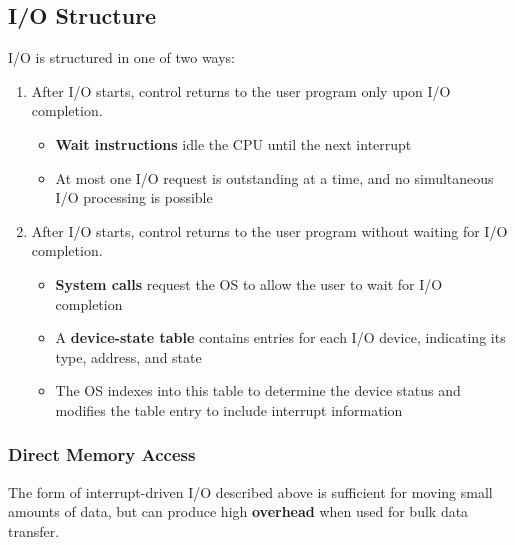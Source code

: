 \documentclass{article}
\begin{document}
\subsection{I/O	Structure}
I/O is structured in one of two ways:
\begin{enumerate}
    \item After I/O starts, control returns to the user program only
          upon I/O completion.
          \begin{itemize}
              \item \textbf{Wait instructions} idle the CPU until the
                    next interrupt
              \item At most one I/O request is outstanding at a time,
                    and no simultaneous I/O processing is possible
          \end{itemize}
    \item After I/O starts, control returns to the user program without
          waiting for I/O completion.
          \begin{itemize}
              \item \textbf{System calls} request the OS to allow the
                    user to wait for I/O completion
              \item A \textbf{device-state table} contains entries for
                    each I/O device, indicating its type, address, and
                    state
              \item The OS indexes into this table to determine the
                    device status and modifies the table entry to
                    include interrupt information
          \end{itemize}
\end{enumerate}
\subsubsection{Direct Memory Access}
The form of interrupt-driven I/O described above is sufficient for
moving small amounts of data, but can produce high \textbf{overhead}
when used for bulk data transfer.
\end{document}
